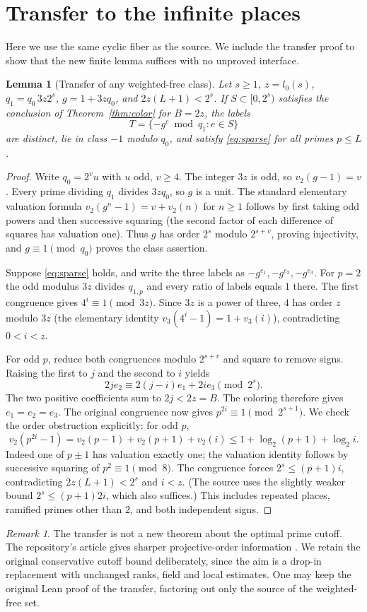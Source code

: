 \documentclass[11pt]{article}
\newtheorem{lemma}[theorem]{Lemma}
\theoremstyle{remark}\newtheorem{remark}[theorem]{Remark}
\begin{document}
\section{Transfer to the infinite places}\label{sec:transfer}
Here we use the same cyclic fiber as the source. We include the transfer proof to show that the new finite lemma suffices with no unproved interface.
\begin{lemma}[Transfer of any weighted-free class]\label{lem:transfer}
Let $s\ge1$, $z=l_0(s)$, $q_1=q_0\,3z2^s$, $g=1+3zq_0$, and $2z(L+1)<2^s$. If $S\subset[0,2^s)$ satisfies the conclusion of Theorem~\ref{thm:color} for $B=2z$, the labels
\[
 T=\{-g^e\bmod q_1:e\in S\}
\]
are distinct, lie in class $-1$ modulo $q_0$, and satisfy \eqref{eq:sparse} for all primes $p\le L$.
\end{lemma}
\begin{proof}
Write $q_0=2^v u$ with $u$ odd, $v\ge4$. The integer $3z$ is odd, so $v_2(g-1)=v$. Every prime dividing $q_1$ divides $3zq_0$, so $g$ is a unit. The standard elementary valuation formula $v_2(g^n-1)=v+v_2(n)$ for $n\ge1$ follows by first taking odd powers and then successive squaring (the second factor of each difference of squares has valuation one). Thus $g$ has order $2^s$ modulo $2^{s+v}$, proving injectivity, and $g\equiv1\pmod{q_0}$ proves the class assertion.

Suppose \eqref{eq:sparse} holds, and write the three labels as $-g^{e_1},-g^{e_2},-g^{e_3}$. For $p=2$ the odd modulus $3z$ divides $q_{1,p}$ and every ratio of labels equals $1$ there. The first congruence gives $4^i\equiv1\pmod{3z}$. Since $3z$ is a power of three, $4$ has order $z$ modulo $3z$ (the elementary identity $v_3(4^i-1)=1+v_3(i)$), contradicting $0<i<z$.

For odd $p$, reduce both congruences modulo $2^{s+v}$ and square to remove signs. Raising the first to $j$ and the second to $i$ yields
\[
 2j e_2\equiv 2(j-i)e_1+2i e_3\pmod{2^s}.
\]
The two positive coefficients sum to $2j<2z=B$. The coloring therefore gives $e_1=e_2=e_3$. The original congruence now gives $p^{2i}\equiv1\pmod{2^{s+1}}$. We check the order obstruction explicitly: for odd $p$,
\[
 v_2(p^{2i}-1)=v_2(p-1)+v_2(p+1)+v_2(i)
 \le 1+\log_2(p+1)+\log_2 i.
\]
Indeed one of $p\pm1$ has valuation exactly one; the valuation identity follows by successive squaring of $p^2\equiv1\pmod 8$. The congruence forces $2^s\le(p+1)i$, contradicting $2z(L+1)<2^s$ and $i<z$. (The source uses the slightly weaker bound $2^s\le(p+1)2i$, which also suffices.) This includes repeated places, ramified primes other than $2$, and both independent signs.
\end{proof}
\begin{remark}
The transfer is not a new theorem about the optimal prime cutoff. The repository's article gives sharper projective-order information \cite{gpp}. We retain the original conservative cutoff bound deliberately, since the aim is a drop-in replacement with unchanged ranks, field and local estimates. One may keep the original Lean proof of the transfer, factoring out only the source of the weighted-free set.
\end{remark}
\end{document}
